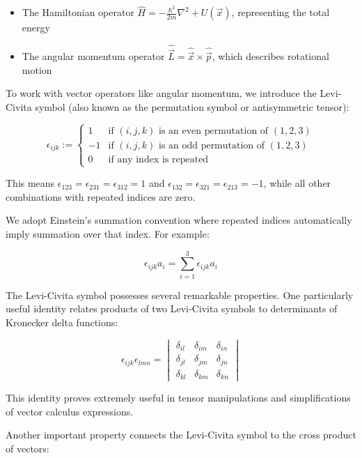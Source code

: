 \documentclass[italian]{HKNdocument}
\begin{document}
\begin{itemize}
  \item The Hamiltonian operator $\hat{H}=-\frac{\hbar^{2}}{2 m} \nabla^{2}+U(\vec{x})$, representing the total energy
  \item The angular momentum operator $\hat{\vec{L}}=\hat{\vec{x}} \times \hat{\vec{p}}$, which describes rotational motion
\end{itemize}

To work with vector operators like angular momentum, we introduce the Levi-Civita symbol (also known as the permutation symbol or antisymmetric tensor):

\[
\epsilon_{i j k}:= \begin{cases}
1 & \text{if $(i,j,k)$ is an even permutation of $(1,2,3)$} \label{eq:1.43}\\
-1 & \text{if $(i,j,k)$ is an odd permutation of $(1,2,3)$} \\
0 & \text{if any index is repeated}
\end{cases}
\]

This means $\epsilon_{123} = \epsilon_{231} = \epsilon_{312} = 1$ and $\epsilon_{132} = \epsilon_{321} = \epsilon_{213} = -1$, while all other combinations with repeated indices are zero.

We adopt Einstein's summation convention where repeated indices automatically imply summation over that index. For example:

\begin{equation}
\epsilon_{i j k} a_{i}=\sum_{i=1}^3 \epsilon_{i j k} a_{i} \label{eq:1.44}
\end{equation}

The Levi-Civita symbol possesses several remarkable properties. One particularly useful identity relates products of two Levi-Civita symbols to determinants of Kronecker delta functions:

\[
\epsilon_{i j k} \epsilon_{l m n}=\begin{vmatrix}
\delta_{i l} & \delta_{i m} & \delta_{i n} \label{eq:1.45}\\
\delta_{j l} & \delta_{j m} & \delta_{j n} \\
\delta_{k l} & \delta_{k m} & \delta_{k n}
\end{vmatrix}
\]

This identity proves extremely useful in tensor manipulations and simplifications of vector calculus expressions.

Another important property connects the Levi-Civita symbol to the cross product of vectors:
\end{document}

